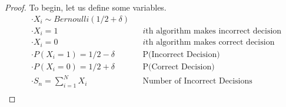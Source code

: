\begin{proof}
    To begin, let us define some variables. 
    \begin{align*}
    & \cdot X_i \sim Bernoulli(1/2 + \delta) \\ 
    & \cdot X_i = 1 && i\text{th algorithm makes incorrect decision} \\ 
    & \cdot X_i = 0 && i\text{th algorithm makes correct decision} \\ 
    & \cdot P(X_i = 1) = 1/2 - \delta && \text{P(Incorrect Decision)} \\ 
    & \cdot P(X_i = 0) = 1/2 + \delta && \text{P(Correct Decision)} \\ 
    & \cdot S_n = \sum_{i=1}^{N}X_i && \text{Number of Incorrect Decisions} \\ 
    \end{align*}
    

\end{proof}
